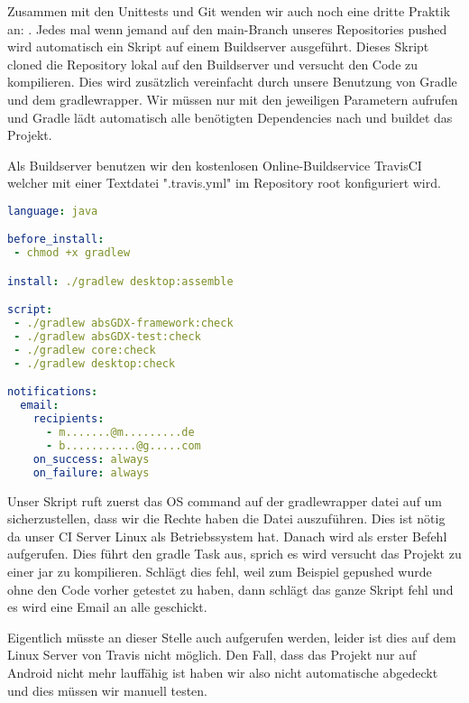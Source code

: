 Zusammen mit den Unittests und Git wenden wir auch noch eine dritte Praktik an: .
Jedes mal wenn jemand auf den main-Branch unseres Repositories pushed wird automatisch ein Skript auf einem Buildserver ausgeführt.
Dieses Skript cloned die Repository lokal auf den Buildserver und versucht den Code zu kompilieren. Dies wird zusätzlich vereinfacht durch unsere Benutzung von Gradle und dem gradlewrapper. Wir müssen nur  mit den jeweiligen Parametern aufrufen und Gradle lädt automatisch alle benötigten Dependencies nach und buildet das Projekt.

Als Buildserver benutzen wir den kostenlosen Online-Buildservice TravisCI \cite{TRVS} welcher mit einer Textdatei ".travis.yml" im Repository root konfiguriert wird.

\begin{lstlisting}[caption=TravisCI Konfiguration, title=\hspace{0 pt}, language=yaml]
language: java

before_install:
 - chmod +x gradlew

install: ./gradlew desktop:assemble

script: 
 - ./gradlew absGDX-framework:check
 - ./gradlew absGDX-test:check
 - ./gradlew core:check
 - ./gradlew desktop:check

notifications:
  email:
    recipients:
      - m.......@m.........de
      - b...........@g.....com
    on_success: always
    on_failure: always
\end{lstlisting}

Unser Skript ruft zuerst das OS command  auf der gradlewrapper datei auf um sicherzustellen, dass wir die Rechte haben die Datei auszuführen. Dies ist nötig da unser CI Server Linux als Betriebssystem hat.
Danach wird als erster Befehl  aufgerufen. Dies führt den gradle Task  aus, sprich es wird versucht das Projekt zu einer jar zu kompilieren. Schlägt dies fehl, weil zum Beispiel gepushed wurde ohne den Code vorher getestet zu haben, dann schlägt das ganze Skript fehl und es wird eine Email an alle  geschickt.

Eigentlich müsste an dieser Stelle auch  aufgerufen werden, leider ist dies auf dem Linux Server von Travis nicht möglich. Den Fall, dass das Projekt nur auf Android nicht mehr lauffähig ist haben wir also nicht automatische abgedeckt und dies müssen wir manuell testen.

